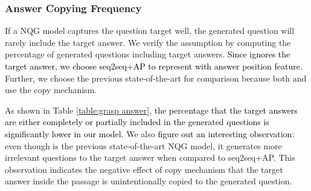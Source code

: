 \documentclass[letterpaper]{article} %
\newcommand{\hh}[1]{\textcolor{black}{#1}}
\begin{document}
\subsubsection{Answer Copying Frequency}
%
%
%
If a NQG model captures the question target well, the generated question will rarely include the target answer. We verify the assumption by computing the percentage of generated questions including target answers. \hh{Since \cite{du2017learning} ignores the target answer, we choose seq2seq+AP to represent \cite{du2017learning} with answer position feature. } Further, we choose the previous state-of-the-art \cite{song2018leveraging} for comparison because both \cite{zhou2017neural} and \cite{song2018leveraging} use the copy mechanism.
%
%
%
%
%
%

As shown in Table \ref{table:grasp answer}, \hh{the percentage that the target answers are either completely or partially included in the generated questions is significantly lower in our model.} We also \hh{figure out an interesting observation}: even though \cite{song2018leveraging} is the previous state-of-the-art NQG model, it generates more irrelevant questions to the target answer when compared to seq2seq+AP. This observation indicates the negative effect of copy mechanism that the target answer inside the passage is unintentionally copied to the generated question.
%
%
%
%
\end{document}
